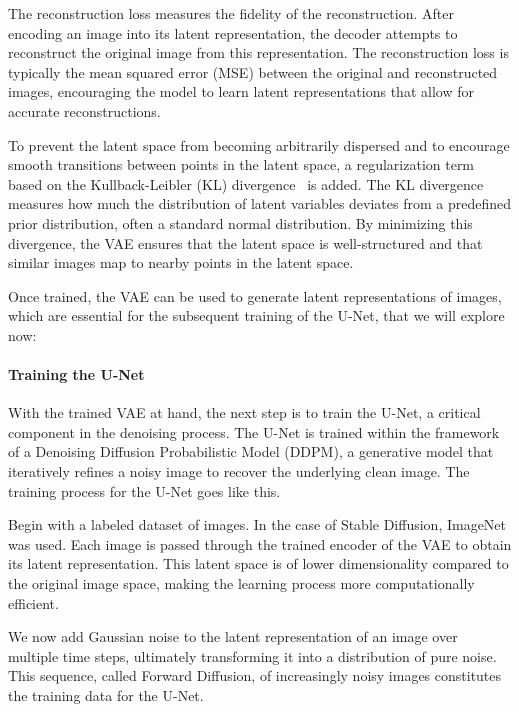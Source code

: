 \documentclass[11pt]{article}
\begin{document}
The reconstruction loss measures the fidelity of the reconstruction. After encoding an image into its latent representation, the decoder attempts to reconstruct the original image from this representation. The reconstruction loss is typically the mean squared error (MSE) between the original and reconstructed images, encouraging the model to learn latent representations that allow for accurate reconstructions.

To prevent the latent space from becoming arbitrarily dispersed and to encourage smooth transitions between points in the latent space, a regularization term based on the Kullback-Leibler (KL) divergence~\cite{kullback1951OnInformationandSufficiency} is added. The KL divergence measures how much the distribution of latent variables deviates from a predefined prior distribution, often a standard normal distribution. By minimizing this divergence, the VAE ensures that the latent space is well-structured and that similar images map to nearby points in the latent space.

Once trained, the VAE can be used to generate latent representations of images, which are essential for the subsequent training of the U-Net, that we will explore now:

\paragraph{Training the U-Net}
With the trained VAE at hand, the next step is to train the U-Net, a critical component in the denoising process. The U-Net is trained within the framework of a Denoising Diffusion Probabilistic Model (DDPM)\cite{ho2020denoisingdiffusionprobabilisticmodels}, a generative model that iteratively refines a noisy image to recover the underlying clean image. The training process for the U-Net goes like this.

Begin with a labeled dataset of images. In the case of Stable Diffusion, ImageNet\cite{deng2009imagenet} was used. Each image is passed through the trained encoder of the VAE to obtain its latent representation. This latent space is of lower dimensionality compared to the original image space, making the learning process more computationally efficient.

We now add Gaussian noise to the latent representation of an image over multiple time steps, ultimately transforming it into a distribution of pure noise. This sequence, called Forward Diffusion, of increasingly noisy images constitutes the training data for the U-Net.
\end{document}
